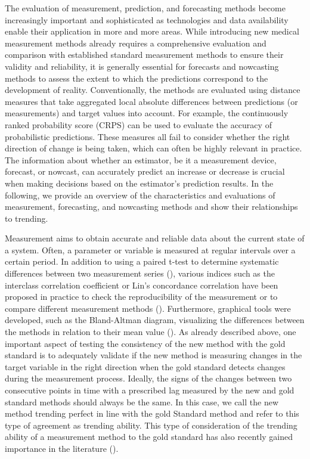 The evaluation of measurement, prediction, and forecasting methods become increasingly important and sophisticated as technologies and data availability enable their application in more and more areas. While introducing new medical measurement methods already requires a comprehensive evaluation and comparison with established standard measurement methods to ensure their validity and reliability, it is generally essential for forecasts and nowcasting methods to assess the extent to which the predictions correspond to the development of reality. Conventionally, the methods are evaluated using distance measures that take aggregated local absolute differences between predictions (or measurements) and target values into account. For example, the continuously ranked probability score (CRPS) can be used to evaluate the accuracy of probabilistic predictions. %
These measures all fail to consider whether the right direction of change is being taken, which can often be highly relevant in practice. The information about whether an estimator, be it a measurement device, forecast, or nowcast, can accurately predict an increase or decrease is crucial when making decisions based on the estimator's prediction results. In the following, we provide an overview of the characteristics and evaluations of measurement, forecasting, and nowcasting methods and show their relationships to trending. 

Measurement aims to obtain accurate and reliable data about the current state of a system. Often, a parameter or variable is measured at regular intervals over a certain period. In addition to using a paired t-test to determine systematic differences between two measurement series (\cite{watson2010method}), various indices such as the interclass correlation coefficient or Lin's concordance correlation have been proposed in practice to check the reproducibility of the measurement or to compare different measurement methods (\cite{lawrence1989concordance,koo2016guideline}). Furthermore, graphical tools were developed, such as the Bland-Altman diagram, visualizing the differences between the methods in relation to their mean value (\cite{bland1986statistical}). As already described above, one important aspect of testing the consistency of the new method with the gold standard is to adequately validate if the new method is measuring changes in the target variable in the right direction when the gold standard detects changes during the measurement process. 
Ideally, the signs of the changes between two consecutive points in time with a prescribed lag measured by the new and gold standard methods should always be the same. 
In this case, we call the new method trending perfect in line with the gold Standard method and refer to this type of agreement as trending ability. 
This type of consideration of the trending ability of a measurement method to the gold standard has also recently gained importance in the literature (\cite{saugel2015tracking, saugel2018error, hiraishi2021concordance}). 

